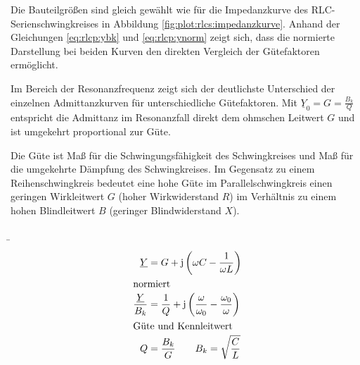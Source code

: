 \begin{frame}
{    Die Bauteilgrößen sind gleich gewählt wie für die Impedanzkurve des RLC-Serienschwingkreises in Abbildung \ref{fig:plot:rlcs:impedanzkurve}.
    Anhand der Gleichungen \ref{eq:rlcp:ybk} und \ref{eq:rlcp:ynorm} zeigt sich, dass die normierte Darstellung bei beiden Kurven den direkten Vergleich
    der Gütefaktoren ermöglicht. 

    Im Bereich der Resonanzfrequenz zeigt sich der deutlichste Unterschied der einzelnen Admittanzkurven für unterschiedliche Gütefaktoren.
    Mit $\underline{Y}_0 = G = \frac{B_k}{Q}$ entspricht die Admittanz im Resonanzfall direkt dem ohmschen Leitwert $G$ 
    und ist umgekehrt proportional zur Güte.
        
    Die Güte ist Maß für die Schwingungsfähigkeit des Schwingkreises und Maß für die umgekehrte Dämpfung des Schwingkreises.
    Im Gegensatz zu einem Reihenschwingkreis bedeutet eine hohe Güte im Parallelschwingkreis einen 
    geringen Wirkleitwert $G$ (hoher Wirkwiderstand $R$) im Verhältnis zu einem
    hohen Blindleitwert $B$ (geringer Blindwiderstand $X$).
    }%
    \b{%
    \begin{minipage}{0.3\textwidth}%
    \begin{align}
        \underline{Y} &= G + \mathrm{j}\left(\omega C - \frac{1}{\omega L}\right)\\
            \intertext{normiert}
        \frac{\underline{Y}}{B_k} &= \frac{1}{Q} + \mathrm{j}\left(\frac{\omega}{\omega_0} - \frac{\omega_0}{\omega}\right)\\
            \intertext{Güte und Kennleitwert}
        Q &= \frac{B_k}{G} \qquad B_k = \sqrt{\frac{C}{L}}
    \end{align}
    \end{minipage}\hfill%
    \begin{minipage}{0.65\textwidth}\centering
    \end{minipage}
    }
    \end{frame}    


